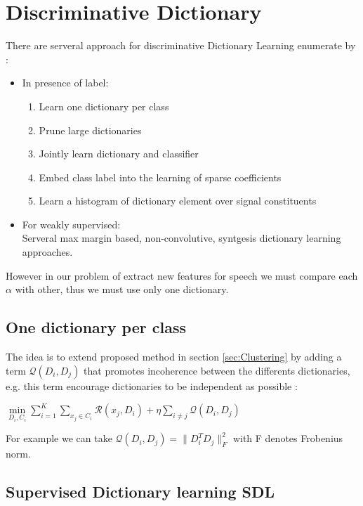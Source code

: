 \documentclass[a4paper,10pt]{article}
\begin{document}
\section{Discriminative Dictionary }
There are serveral approach for discriminative Dictionary Learning enumerate by \cite{8294264}:
\begin{itemize}
 \item In presence of label:
    \begin{enumerate}
     \item Learn one dictionary per class
     \item Prune large dictionaries
     \item Jointly learn dictionary and classifier
     \item Embed class label into the learning of sparse coefficients
     \item Learn a histogram of dictionary element over signal constituents
    \end{enumerate}

 \item For weakly supervised:\\
    Serveral max margin based, non-convolutive, syntgesis dictionary learning approaches.
\end{itemize}
However in our problem of extract new features for speech we must compare each $\alpha$ with other, thus we must use only one dictionary.
\subsection{One dictionary per class}
The idea is to extend proposed method in  section \ref{sec:Clustering} by adding a term $\mathcal{Q}(D_i,D_j)$ that promotes incoherence between the differents dictionaries, e.g. this term encourage dictionaries to  be independent as possible :
\begin{center}
 $\underset{D_i, C_i}{\min} \sum_{i=1}^{K} \sum_{x_j \in C_i} \mathcal{R}(x_j,D_i) + \eta \sum_{i \neq j} \mathcal{Q}(D_i,D_j)$
\end{center}
For example we can take $\mathcal{Q}(D_i,D_j) = \|D^T_iD_j\|^2_F $ with F denotes Frobenius norm.

\subsection{Supervised Dictionary learning SDL}
\end{document}

